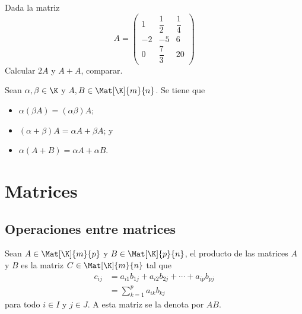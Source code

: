 \documentclass[compacto,10pt]{pubciencias-notas}
\begin{document}
\begin{ejer}\hspace{0pt} Dada la matriz 
\[
    A = 
    \begin{pmatrix}
    1&\dfrac{1}{2}&\dfrac{1}{4}\\
    -2&-5&6\\
    0&\dfrac{7}{3}&20
    \end{pmatrix}
\]
Calcular   $2A$ y $A + A$, comparar.
\end{ejer}

\begin{teo}\label{Teo:Sem01Cla01PropMult}
    Sean $\alpha,\beta \in \K$ y $A,B\in\Mat[\K]{m}{n}$. Se tiene que
    \begin{itemize}
    \item[$a)$] 
        $\alpha(\beta A) = (\alpha\beta)A$;
    \item[$b)$] 
        $(\alpha+\beta)A = \alpha A + \beta A$; y
    \item[$c)$] 
        $\alpha(A+B) = \alpha A + \alpha B$.
    \end{itemize}
\end{teo}

\section{Matrices}
\setcounter{subsection}{1}
\subsection{Operaciones entre matrices}

\begin{defi}\label{Sem01Clas01DefMultMAt}
    Sean $A \in \Mat[\K]{m}{p}$ y $B \in \Mat[\K]{p}{n}$, el producto de las matrices $A$ y $B$ es la matriz $C \in \Mat[\K]{m}{n}$ tal que
    \begin{align*}
        c_{ij} & = a_{i1}b_{1j} + a_{i2} b_{2j} + \cdots + a_{ip}b_{pj} \\
               & = \sum_{k=1}^p a_{ik} b_{kj}
    \end{align*}
    para todo $i \in I$ y $j \in J$. A esta matriz se la denota por $AB$.
\end{defi}
\end{document}
